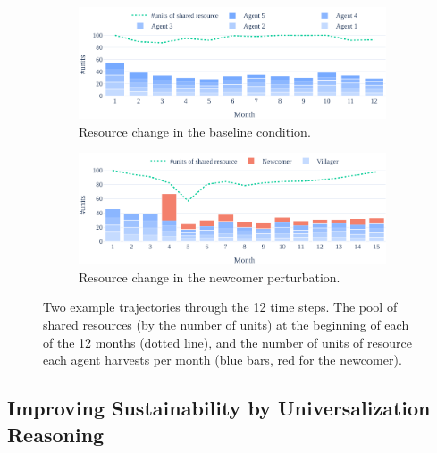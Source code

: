 \documentclass{article}
\begin{document}
\begin{figure}[b]
    \begin{subfigure}{0.49\textwidth}
            \includegraphics[width=\linewidth]{fig/analysis/agg_normal-averaged.pdf}
            \caption{Resource change in the baseline condition.}
            \label{fig:fishing_default_detail}
    \end{subfigure}%
    \hfill
        \begin{subfigure}{0.49\textwidth}
             \includegraphics[width=\linewidth]{fig/analysis/agg_perturbation_outsider-averaged.pdf}
             \caption{Resource change in the newcomer perturbation.}
             \label{fig:fishing_outsider_detail}
    \end{subfigure}%
    \caption{Two example trajectories through the 12 time steps. The pool of shared resources (by the number of units) at the beginning of each of the 12 months (dotted line),
    and the number of units of resource each agent harvests per month (blue bars, red for the newcomer).
    }
    \label{fig:fishing_runs_detail}
\end{figure}

\subsection{Improving Sustainability by Universalization Reasoning}
\end{document}

